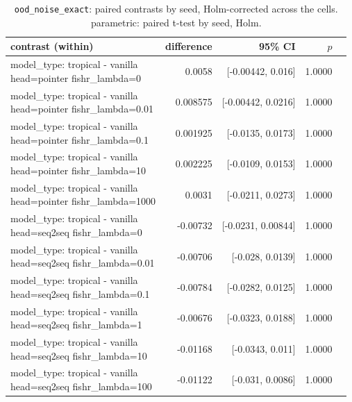 \documentclass[10pt]{article}
\makeatletter
\newcommand{\stackcell}[1]{\begin{tabular}[t]{@{}l@{}}#1\end{tabular}}
\makeatother
\begin{document}
{\small
\begin{longtable}{lrrrl}
\caption{\texttt{ood\_noise\_exact}: paired contrasts by seed, Holm-corrected across the cells. parametric: paired t-test by seed, Holm.}\label{tab:paired-ood_noise_exact}\\
\toprule
contrast (within) & difference & 95\% CI & $p$ & \\
\midrule
\endhead
\stackcell{model\_type: tropical - vanilla\\\footnotesize head=pointer fishr\_lambda=0 } & 0.0058 & [-0.00442, 0.016] & 1.0000 & \\
\stackcell{model\_type: tropical - vanilla\\\footnotesize head=pointer fishr\_lambda=0.01 } & 0.008575 & [-0.00442, 0.0216] & 1.0000 & \\
\stackcell{model\_type: tropical - vanilla\\\footnotesize head=pointer fishr\_lambda=0.1 } & 0.001925 & [-0.0135, 0.0173] & 1.0000 & \\
\stackcell{model\_type: tropical - vanilla\\\footnotesize head=pointer fishr\_lambda=10 } & 0.002225 & [-0.0109, 0.0153] & 1.0000 & \\
\stackcell{model\_type: tropical - vanilla\\\footnotesize head=pointer fishr\_lambda=1000 } & 0.0031 & [-0.0211, 0.0273] & 1.0000 & \\
\stackcell{model\_type: tropical - vanilla\\\footnotesize head=seq2seq fishr\_lambda=0 } & -0.00732 & [-0.0231, 0.00844] & 1.0000 & \\
\stackcell{model\_type: tropical - vanilla\\\footnotesize head=seq2seq fishr\_lambda=0.01 } & -0.00706 & [-0.028, 0.0139] & 1.0000 & \\
\stackcell{model\_type: tropical - vanilla\\\footnotesize head=seq2seq fishr\_lambda=0.1 } & -0.00784 & [-0.0282, 0.0125] & 1.0000 & \\
\stackcell{model\_type: tropical - vanilla\\\footnotesize head=seq2seq fishr\_lambda=1 } & -0.00676 & [-0.0323, 0.0188] & 1.0000 & \\
\stackcell{model\_type: tropical - vanilla\\\footnotesize head=seq2seq fishr\_lambda=10 } & -0.01168 & [-0.0343, 0.011] & 1.0000 & \\
\stackcell{model\_type: tropical - vanilla\\\footnotesize head=seq2seq fishr\_lambda=100 } & -0.01122 & [-0.031, 0.0086] & 1.0000 & \\

\end{longtable}}
\end{document}
